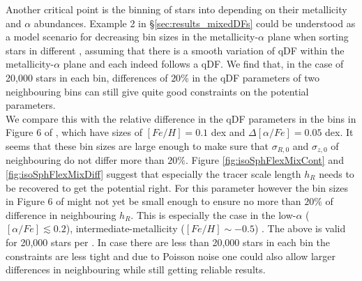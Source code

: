  Another critical point is the binning of stars into \MAPs{} depending on their metallicity and $\alpha$ abundances. Example 2 in \S\ref{sec:results_mixedDFs} could be understood as a model scenario for decreasing bin sizes in the metallicity-$\alpha$ plane when sorting stars in different \MAPs{}, assuming that there is a smooth variation of qDF within the metallicity-$\alpha$ plane and each \MAP{} indeed follows a qDF. We find that, in the case of 20,000 stars in each bin, differences of $20\%$ in the qDF parameters of two neighbouring bins can still give quite good constraints on the potential parameters. 
\\We compare this with the relative difference in the qDF parameters in the bins in Figure 6 of \cite{bov13}, which have sizes of $[Fe/H] = 0.1$ dex and $\Delta [\alpha/Fe] = 0.05$ dex. It seems that these bin sizes are large enough to make sure that $\sigma_{R,0}$ and $\sigma_{z,0}$ of neighbouring \MAPs{} do not differ more than $20\%$. Figure \ref{fig:isoSphFlexMixCont} and \ref{fig:isoSphFlexMixDiff} suggest that especially the tracer scale length $h_R$ needs to be recovered to get the potential right. For this parameter however the bin sizes in Figure 6 of \cite{bov13} might not yet be small enough to ensure no more than $20\%$ of difference in neighbouring $h_R$. This is especially the case in the low-$\alpha$ ($[\alpha/Fe] \lesssim 0.2$), intermediate-metallicity ($[Fe/H] \sim -0.5$) \MAPs{}. The above is valid for 20,000 stars per \MAP{}. In case there are less than 20,000 stars in each bin the constraints are less tight and due to Poisson noise one could also allow larger differences in neighbouring \MAPs{} while still getting reliable results.

